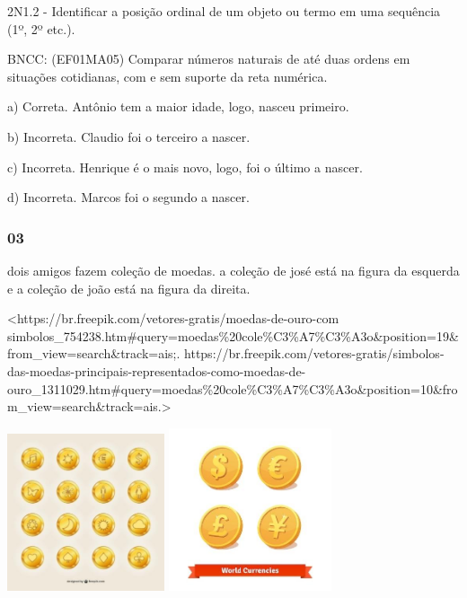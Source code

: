 2N1.2 - Identificar a posição ordinal de um objeto ou termo em uma
sequência (1º, 2º etc.).

BNCC: (EF01MA05) Comparar números naturais de até duas ordens em
situações cotidianas, com e sem suporte da reta numérica.

a) Correta. Antônio tem a maior idade, logo, nasceu primeiro.

b) Incorreta. Claudio foi o terceiro a nascer.

c) Incorreta. Henrique é o mais novo, logo, foi o último a nascer.

d) Incorreta. Marcos foi o segundo a nascer.

\subsubsection{03}\label{section-104}

dois amigos fazem coleção de moedas. a coleção de josé está na figura da
esquerda e a coleção de joão está na figura da direita.

\textless{}https://br.freepik.com/vetores-gratis/moedas-de-ouro-com
simbolos\_754238.htm\#query=moedas\%20cole\%C3\%A7\%C3\%A3o\&position=19\&from\_view=search\&track=ais;.
https://br.freepik.com/vetores-gratis/simbolos-das-moedas-principais-representados-como-moedas-de-ouro\_1311029.htm\#query=moedas\%20cole\%C3\%A7\%C3\%A3o\&position=10\&from\_view=search\&track=ais.\textgreater{}

\includegraphics[width=1.82292in,height=1.82292in]{media/image111.jpg}
\includegraphics[width=1.88542in,height=1.88542in]{media/image112.jpg}

